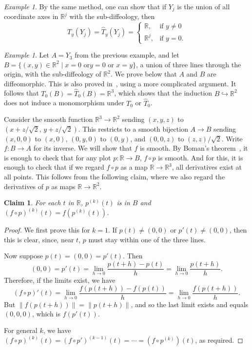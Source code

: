 \documentclass[12pt]{amsart}
\newtheorem*{claim*}{Claim}
\theoremstyle{remark}
\newtheorem{ex}[de]{Example}
\def \R{\mathbb{R}}
\begin{document}
\begin{ex}
By the same method, one can show that if $Y_j$ is the union of all coordinate axes in $\R^j$ with the sub-diffeology, then
\[
T_y(Y_j)=\hat{T}_y(Y_j)=\begin{cases} \R, & \textrm{if $y \neq 0$}\\ \R^j, & \textrm{if $y=0$}. \end{cases}
\]
\end{ex}

\begin{ex}\label{ex:axes-in-R3}
Let $A = Y_3$ from the previous example, and
let $B = \{ (x,y) \in \R^2 \mid x = 0 \text{ or} y = 0 \text{ or } x = y \}$,
a union of three lines through the origin, with the sub-diffeology of $\R^2$.
We prove below that $A$ and $B$ are diffeomorphic.
This is also proved in~\cite[Example~2.72]{Wa}, using a more complicated argument.
It follows that $T_0(B) = \hat{T}_0(B) = \R^3$,
which shows that the induction $B \hookrightarrow \R^2$ does not induce a
monomorphism under $T_0$ or $\hat{T}_0$.

Consider the smooth function $\R^3 \to \R^2$ sending $(x,y,z)$ to
$(x+z/\sqrt{2},\, y+z/\sqrt{2})$.
This restricts to a smooth bijection $A \to B$ sending
$(x, 0, 0)$ to $(x, 0)$, $(0, y, 0)$ to $(0, y)$, and
$(0, 0, z)$ to $(z, z)/\sqrt{2}$.
Write $f : B \to A$ for its inverse.  We will show that $f$ is smooth.
By Boman's theorem~\cite[Corollary~3.14]{KM},
it is enough to check that for any plot $p : \R \to B$, $f \circ p$ is smooth.
And for this, it is enough to check that if we regard $f \circ p$ as a map
$\R \to \R^3$, all derivatives exist at all points.
This follows from the following claim, where we also regard
the derivatives of $p$ as maps $\R \to \R^2$.
\end{ex}

\begin{claim*}
For each $t$ in $\R$, $p^{(k)}(t)$ is in $B$ and $(f \circ p)^{(k)}(t) = f(p^{(k)}(t))$.
\end{claim*}

\begin{proof}
We first prove this for $k = 1$.
If $p(t) \neq (0,0)$ or $p'(t) \neq (0,0)$, then this is clear,
since, near $t$, $p$ must stay within one of the three lines.
%

Now suppose $p(t) = (0,0) = p'(t)$.  Then
\[
  (0,0) = p'(t) = \lim_{h \to 0} \frac{p(t+h)-p(t)}{h} = \lim_{h \to 0} \frac{p(t+h)}{h} .
\]
Therefore, if the limits exist, we have
\[
  (f \circ p)'(t) = \lim_{h \to 0} \frac{f(p(t+h)) - f(p(t))}{h} = \lim_{h \to 0} \frac{f(p(t+h))}{h} .
\]
But $\|f(p(t+h))\| = \|p(t+h)\|$, %
and so the last limit exists and equals $(0,0,0)$, which is $f(p'(t))$.

For general $k$, we have
$(f \circ p)^{(k)}(t) = (f \circ p')^{(k-1)}(t) = \cdots = (f \circ p^{(k)})(t)$, as required.
\end{proof}
\end{document}
